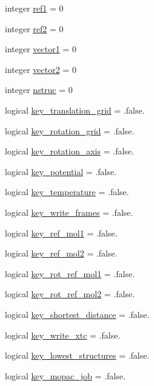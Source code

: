 \begin{DoxyCompactItemize}
\item 
integer \hyperlink{namespacemod__input__read_a1fffe01a8c7b8966aa213553649f0cce}{ref1} = 0
\item 
integer \hyperlink{namespacemod__input__read_afe9324d2c3dd5b8f8d1afb900599f1e3}{ref2} = 0
\item 
integer \hyperlink{namespacemod__input__read_a9b7f8f60997dd0fb2edfa04aef14fa29}{vector1} = 0
\item 
integer \hyperlink{namespacemod__input__read_afe62d1fbe309ed810c66abd20164a320}{vector2} = 0
\item 
integer \hyperlink{namespacemod__input__read_a176a374fb1f2efbff8fdca2a950c77b0}{nstruc} = 0
\item 
logical \hyperlink{namespacemod__input__read_a668e8b052b58c62bdcb1fde214459cb1}{key\+\_\+translation\+\_\+grid} = .false.
\item 
logical \hyperlink{namespacemod__input__read_a3a5a0477db778e79dd96be267f9ebde5}{key\+\_\+rotation\+\_\+grid} = .false.
\item 
logical \hyperlink{namespacemod__input__read_a72d79af87249c49e917e16ed9978d242}{key\+\_\+rotation\+\_\+axis} = .false.
\item 
logical \hyperlink{namespacemod__input__read_a9227a15f259c9085a4a610eedbcf070c}{key\+\_\+potential} = .false.
\item 
logical \hyperlink{namespacemod__input__read_a119a4d5f6c8db10062bf46a95dc5ddfa}{key\+\_\+temperature} = .false.
\item 
logical \hyperlink{namespacemod__input__read_a54f4396af49b6cf2c5a16f000fa7369b}{key\+\_\+write\+\_\+frames} = .false.
\item 
logical \hyperlink{namespacemod__input__read_a58058a29fc5300521bfe3658ba0444e1}{key\+\_\+ref\+\_\+mol1} = .false.
\item 
logical \hyperlink{namespacemod__input__read_a0e0f6bb92252196980696d427c1e70ed}{key\+\_\+ref\+\_\+mol2} = .false.
\item 
logical \hyperlink{namespacemod__input__read_aa5a0b3c68c22ac66d80805ec388ddc4a}{key\+\_\+rot\+\_\+ref\+\_\+mol1} = .false.
\item 
logical \hyperlink{namespacemod__input__read_abf16c25db5c3926452c89143c7548df7}{key\+\_\+rot\+\_\+ref\+\_\+mol2} = .false.
\item 
logical \hyperlink{namespacemod__input__read_a1956b5de5214082fc58fa663884d9fc8}{key\+\_\+shortest\+\_\+distance} = .false.
\item 
logical \hyperlink{namespacemod__input__read_a3af1716773b868648513ab784756e599}{key\+\_\+write\+\_\+xtc} = .false.
\item 
logical \hyperlink{namespacemod__input__read_a1f5f9ac3d207b274fa7eab7f06a7d472}{key\+\_\+lowest\+\_\+structures} = .false.
\item 
logical \hyperlink{namespacemod__input__read_a273dcae5fbe1ea83ebf236f85d931560}{key\+\_\+mopac\+\_\+job} = .false.
\end{DoxyCompactItemize}


